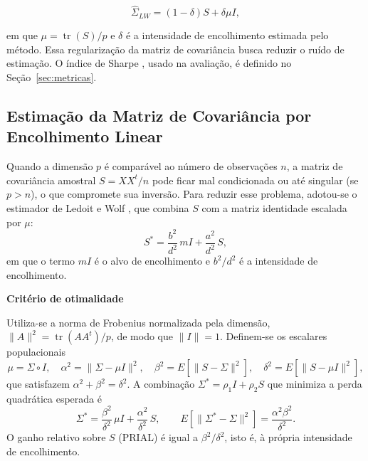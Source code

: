 \documentclass[12pt,a4paper]{article}
\begin{document}
\begin{equation}
\hat{\Sigma}_{LW}=(1-\delta)S+\delta\mu I,
\end{equation}

em que $\mu=\operatorname{tr}(S)/p$ e $\delta$ é a intensidade de encolhimento estimada pelo método. Essa regularização da matriz de covariância busca reduzir o ruído de estimação. O índice de Sharpe \cite{sharpe1966}, usado na avaliação, é definido no Seção~\ref{sec:metricas}.


\subsection{Estimação da Matriz de Covariância por Encolhimento Linear}
\label{sec:ledoit-wolf}

Quando a dimensão $p$ é comparável ao número de observações $n$, a matriz de covariância amostral $S = XX^{t}/n$ pode ficar mal condicionada ou até singular (se $p > n$), o que compromete sua inversão. Para reduzir esse problema, adotou-se o estimador de Ledoit e Wolf \cite{ledoitwolf2004}, que combina $S$ com a matriz identidade escalada por $\mu$:
\begin{equation}
    S^{*} = \frac{b^{2}}{d^{2}}\, m I + \frac{a^{2}}{d^{2}}\, S,
    \label{eq:shrinkage}
\end{equation}
em que o termo $mI$ é o alvo de encolhimento e $b^{2}/d^{2}$ é a intensidade de encolhimento.

\textbf{Critério de otimalidade}

Utiliza-se a norma de Frobenius normalizada pela dimensão, $\|A\|^{2} = \operatorname{tr}(AA^{t})/p$, de modo que $\|I\| = 1$. Definem-se os escalares populacionais
\begin{equation}
    \mu = \Sigma \circ I, \quad
    \alpha^{2} = \|\Sigma - \mu I\|^{2}, \quad
    \beta^{2} = E\!\left[\|S - \Sigma\|^{2}\right], \quad
    \delta^{2} = E\!\left[\|S - \mu I\|^{2}\right],
\end{equation}
que satisfazem $\alpha^{2} + \beta^{2} = \delta^{2}$. A combinação $\Sigma^{*} = \rho_1 I + \rho_2 S$ que minimiza a perda quadrática esperada é
\begin{equation}
    \Sigma^{*} = \frac{\beta^{2}}{\delta^{2}}\,\mu I + \frac{\alpha^{2}}{\delta^{2}}\,S,
    \qquad
    E\!\left[\|\Sigma^{*} - \Sigma\|^{2}\right] = \frac{\alpha^{2}\beta^{2}}{\delta^{2}}.
\end{equation}
O ganho relativo sobre $S$ (PRIAL) é igual a $\beta^{2}/\delta^{2}$, isto é, à própria intensidade de encolhimento.
\end{document}
